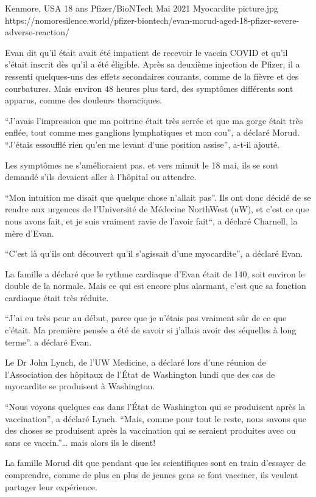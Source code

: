 {Kenmore, USA}
{18 ans}
{Pfizer/BioNTech}
{Mai 2021}
{Myocardite}
{picture.jpg}
{https://nomoresilence.world/pfizer-biontech/evan-morud-aged-18-pfizer-severe-adverse-reaction/}
{

Evan dit qu'il était avait été impatient de recevoir le vaccin COVID et qu'il
s'était inscrit dès qu'il a été éligible. Après sa deuxième injection de Pfizer,
il a ressenti quelques-uns des effets secondaires courants, comme de la fièvre
et des courbatures. Mais environ 48 heures plus tard, des symptômes différents
sont apparus, comme des douleurs thoraciques.

“J'avais l'impression que ma poitrine était très serrée et que ma gorge était
très enflée, tout comme mes ganglions lymphatiques et mon cou”, a déclaré
Morud. “J'étais essoufflé rien qu'en me levant d'une position assise”, a-t-il
ajouté.

Les symptômes ne s'amélioraient pas, et vers minuit le 18 mai, ils se sont demandé s'ils devaient aller à l'hôpital ou attendre.

“Mon intuition me disait que quelque chose n'allait pas”. Ils ont donc décidé de
se rendre aux urgences de l'Université de Médecine NorthWest (uW), et c'est ce
que nous avons fait, et je suis vraiment ravie de l'avoir fait“, a déclaré
Charnell, la mère d'Evan.

“C'est là qu'ils ont découvert qu'il s'agissait d'une myocardite”, a déclaré
Evan.

La famille a déclaré que le rythme cardiaque d'Evan était de 140, soit environ
le double de la normale. Mais ce qui est encore plus alarmant, c'est que sa
fonction cardiaque était très réduite.

“J'ai eu très peur au début, parce que je n'étais pas vraiment sûr de ce que
c'était. Ma première pensée a été de savoir si j'allais avoir des séquelles à
long terme”. a déclaré Evan.

Le Dr John Lynch, de l'UW Medicine, a déclaré lors d'une réunion de
l'Association des hôpitaux de l'État de Washington lundi que des cas de
myocardite se produisent à Washington.

“Nous voyons quelques cas dans l'État de Washington qui se produisent après la
vaccination”, a déclaré Lynch. “Mais, comme pour tout le reste, nous savons que
des choses se produisent après la vaccination qui se seraient produites avec ou
sans ce vaccin.”… mais alors ils le disent!

La famille Morud dit que pendant que les scientifiques sont en train d'essayer
de comprendre, comme de plus en plus de jeunes gens se font vacciner, ils
veulent partager leur expérience.

}
